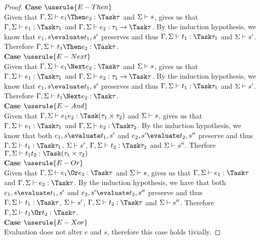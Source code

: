 \begin{proof}
  \noindent\textbf{Case} $\userule{E-Then}$\\
    \indent Given that $\Gamma,\Sigma\infers e_1\Then e_2:\Task \tau$ and
      $\Sigma\vdash s$,  gives us that
      $\Gamma,\Sigma\infers e_1:\Task\tau_1$ and
      $\Gamma,\Sigma\infers e_2:\tau_1 \to \Task \tau$. By the induction
      hypothesis, we know that $e_1,s\evaluate t_1,s'$ preserves and thus
      $\Gamma,\Sigma\infers t_1:\Task\tau_1$ and $\Sigma\vdash s'$. Therefore
      $\Gamma,\Sigma\infers t_1\Then e_2:\Task\tau$.\\

  \noindent\textbf{Case} $\userule{E-Next}$\\
    \indent Given that $\Gamma,\Sigma\infers e_1\Next e_2:\Task \tau$ and
      $\Sigma\vdash s$,  gives us that
      $\Gamma,\Sigma\infers e_1:\Task\tau_1$ and
      $\Gamma,\Sigma\infers e_2:\tau_1 \to \Task \tau$. By the induction
      hypothesis, we know that $e_1,s\evaluate t_1,s'$ preserves and thus
      $\Gamma,\Sigma\infers t_1:\Task\tau_1$ and $\Sigma\vdash s'$. Therefore
      $\Gamma,\Sigma\infers t_1\Next e_2:\Task\tau$.\\

  \noindent\textbf{Case} $\userule{E-And}$\\
    \indent  Given that $\Gamma,\Sigma\infers e_1\And e_2:\Task(\tau_1\times\tau_2)$
      and $\Sigma\vdash s$,  gives us that
      $\Gamma,\Sigma\infers e_1:\Task\tau_1$ and
      $\Gamma,\Sigma\infers e_2:\Task\tau_2$. By the induction hypothesis, we
      know that both $e_1,s\evaluate t_1,s'$ and $e_2,s'\evaluate t_2,s''$
      preserve and thus $\Gamma,\Sigma\infers t_1:\Task\tau_1$,
      $\Sigma\vdash s'$, $\Gamma,\Sigma\infers t_2:\Task\tau_2$ and
      $\Sigma\vdash s''$. Therfore
      $\Gamma,\Sigma\infers t_1\And t_2:\Task(\tau_1\times\tau_2)$\\

  \noindent\textbf{Case} $\userule{E-Or}$\\
    \indent Given that $\Gamma,\Sigma\infers e_1\Or e_2:\Task\tau$ and $\Sigma\vdash s$,  gives us that $\Gamma,\Sigma\infers e_1:\Task\tau$ and
      $\Gamma,\Sigma\infers e_2:\Task\tau$. By the induction hypothesis, we have that both
      $e_1,s\evaluate t_1,s'$ and $e_2,s'\evaluate t_2,s''$ preserve and thus $\Gamma,\Sigma\infers t_1:\Task\tau$, $\Sigma\vdash s'$,
      $\Gamma,\Sigma\infers t_2:\Task\tau$ and $\Sigma\vdash s''$. Therefore $\Gamma,\Sigma\infers t_1\Or t_2:\Task\tau$.\\

  \noindent\textbf{Case} $\userule{E-Xor}$\\
    \indent Evaluation does not alter $e$ and $s$, therefore this case holds tivially.

\end{proof}



